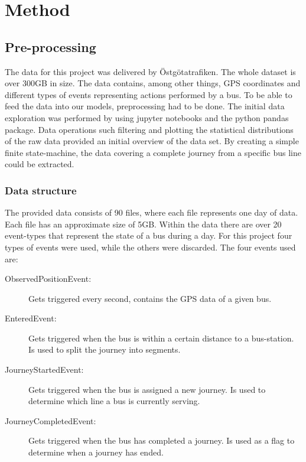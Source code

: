 
\chapter{Method}
\label{cha:method}

\section{Pre-processing}
\label{sec:pre-processing}
The data for this project was delivered by Östgötatrafiken. The whole dataset is over 300GB in size. The data contains, among other things, GPS coordinates and different types of events representing actions performed by a bus. To be able to feed the data into our models, preprocessing had to be done. The initial data exploration was performed by using jupyter notebooks and the python pandas package. Data operations such filtering and plotting the statistical distributions of the raw data provided an initial overview of the data set. By creating a simple finite state-machine, the data covering a complete journey from a specific bus line could be extracted.


\subsection{Data structure}
The provided data consists of 90 files, where each file represents one day of data. Each file has an approximate size of 5GB. Within the data there are over 20 event-types that represent the state of a bus during a day. For this project four types of events were used, while the others were discarded. The four events used are:
\begin{description}
\item[ObservedPositionEvent:] Gets triggered every second, contains the GPS data of a given bus.
\item[EnteredEvent:] Gets triggered when the bus is within a certain distance to a bus-station. Is used to split the journey into segments.
\item[JourneyStartedEvent:] Gets triggered when the bus is assigned a new journey. Is used to determine which line a bus is currently serving.
\item[JourneyCompletedEvent:] Gets triggered when the bus has completed a journey. Is used as a flag to determine when a journey has ended.
\end{description}

